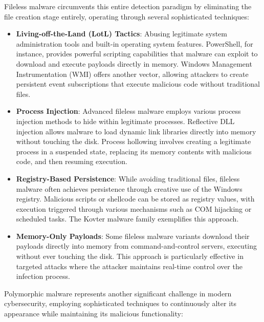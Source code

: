 Fileless malware circumvents this entire detection paradigm by eliminating the file creation stage entirely, operating through several sophisticated techniques:

\begin{itemize}
    \item \textbf{Living-off-the-Land (LotL) Tactics}: Abusing legitimate system administration tools and built-in operating system features. PowerShell, for instance, provides powerful scripting capabilities that malware can exploit to download and execute payloads directly in memory. Windows Management Instrumentation (WMI) offers another vector, allowing attackers to create persistent event subscriptions that execute malicious code without traditional files.
    
    \item \textbf{Process Injection}: Advanced fileless malware employs various process injection methods to hide within legitimate processes. Reflective DLL injection allows malware to load dynamic link libraries directly into memory without touching the disk. Process hollowing involves creating a legitimate process in a suspended state, replacing its memory contents with malicious code, and then resuming execution.
    
    \item \textbf{Registry-Based Persistence}: While avoiding traditional files, fileless malware often achieves persistence through creative use of the Windows registry. Malicious scripts or shellcode can be stored as registry values, with execution triggered through various mechanisms such as COM hijacking or scheduled tasks. The Kovter malware family exemplifies this approach.
    
    \item \textbf{Memory-Only Payloads}: Some fileless malware variants download their payloads directly into memory from command-and-control servers, executing without ever touching the disk. This approach is particularly effective in targeted attacks where the attacker maintains real-time control over the infection process.
\end{itemize}

Polymorphic malware represents another significant challenge in modern cybersecurity, employing sophisticated techniques to continuously alter its appearance while maintaining its malicious functionality:

